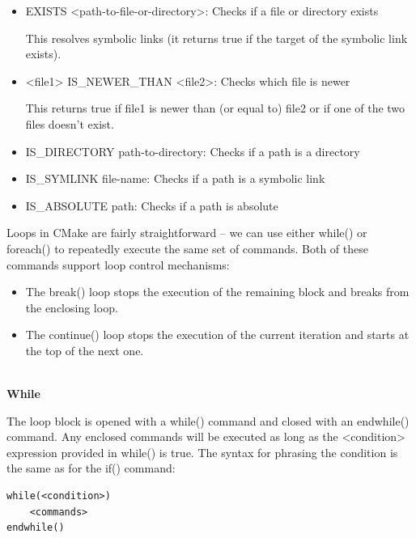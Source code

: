 \begin{itemize}
\item 
EXISTS <path-to-file-or-directory>: Checks if a file or directory exists 

This resolves symbolic links (it returns true if the target of the symbolic link exists).

\item 
<file1> IS\_NEWER\_THAN <file2>: Checks which file is newer

This returns true if file1 is newer than (or equal to) file2 or if one of the two files doesn't exist.

\item 
IS\_DIRECTORY path-to-directory: Checks if a path is a directory

\item 
IS\_SYMLINK file-name: Checks if a path is a symbolic link

\item 
IS\_ABSOLUTE path: Checks if a path is absolute
\end{itemize}


Loops in CMake are fairly straightforward – we can use either while() or foreach() to repeatedly execute the same set of commands. Both of these commands support loop control mechanisms:

\begin{itemize}
\item 
The break() loop stops the execution of the remaining block and breaks from the enclosing loop.

\item 
The continue() loop stops the execution of the current iteration and starts at the top of the next one.
\end{itemize}

\hspace*{\fill} \\ %
\noindent
\textbf{While}

The loop block is opened with a while() command and closed with an endwhile() command. Any enclosed commands will be executed as long as the <condition> expression provided in while() is true. The syntax for phrasing the condition is the same as for the if() command:

\begin{lstlisting}[style=styleCMake]
while(<condition>)
	<commands>
endwhile()
\end{lstlisting}

